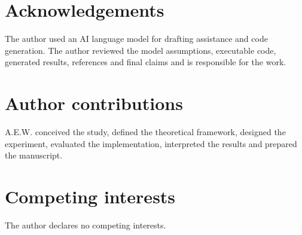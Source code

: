 \documentclass[10pt]{article}
\begin{document}
\section*{Acknowledgements}
The author used an AI language model for drafting assistance and code generation. The author reviewed the model assumptions, executable code, generated results, references and final claims and is responsible for the work.

\section*{Author contributions}
A.E.W. conceived the study, defined the theoretical framework, designed the experiment, evaluated the implementation, interpreted the results and prepared the manuscript.

\section*{Competing interests}
The author declares no competing interests.



\end{document}
